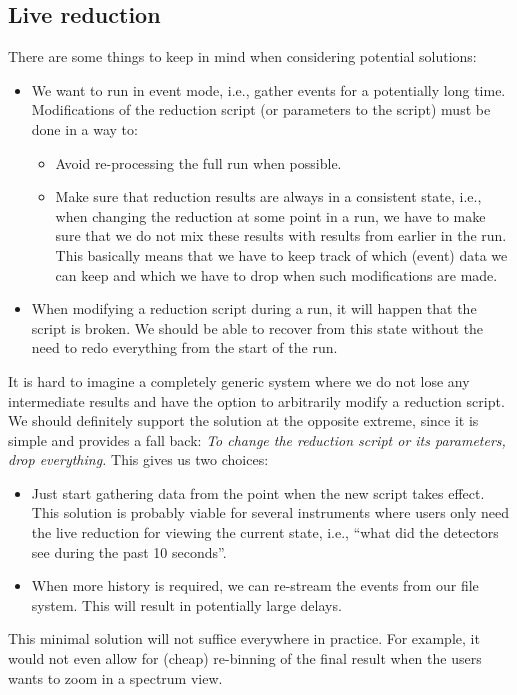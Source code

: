 \documentclass[a4paper,english,numbers=noenddot,bibliography=totoc,chapterprefix=on,DIV=12]{scrartcl}
\begin{document}
\subsection{Live reduction}

There are some things to keep in mind when considering potential solutions:
\begin{itemize}
  \item We want to run in event mode, i.e., gather events for a potentially long time.
    Modifications of the reduction script (or parameters to the script) must be done in a way to:
    \begin{itemize}
      \item Avoid re-processing the full run when possible.
      \item Make sure that reduction results are always in a consistent state, i.e., when changing the reduction at some point in a run, we have to make sure that we do not mix these results with results from earlier in the run.
        This basically means that we have to keep track of which (event) data we can keep and which we have to drop when such modifications are made.
    \end{itemize}
  \item When modifying a reduction script during a run, it will happen that the script is broken.
    We should be able to recover from this state without the need to redo everything from the start of the run.
\end{itemize}
It is hard to imagine a completely generic system where we do not lose any intermediate results and have the option to arbitrarily modify a reduction script.
We should definitely support the solution at the opposite extreme, since it is simple and provides a fall back:
\emph{To change the reduction script or its parameters, drop everything.}
This gives us two choices:
\begin{itemize}
  \item Just start gathering data from the point when the new script takes effect.
    This solution is probably viable for several instruments where users only need the live reduction for viewing the current state, i.e., ``what did the detectors see during the past 10 seconds''.
  \item When more history is required, we can re-stream the events from our file system.
    This will result in potentially large delays.
\end{itemize}
This minimal solution will not suffice everywhere in practice.
For example, it would not even allow for (cheap) re-binning of the final result when the users wants to zoom in a spectrum view.
\end{document}
